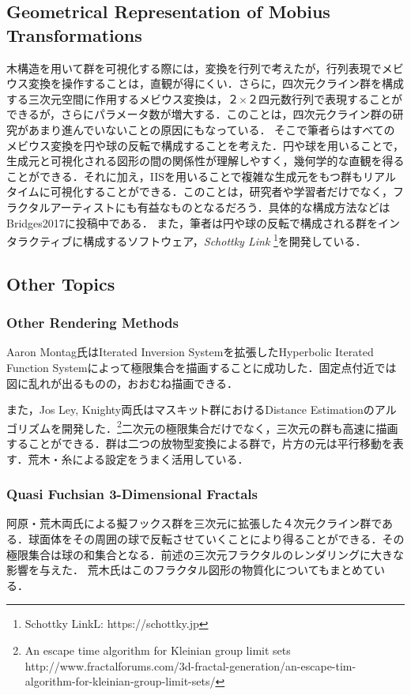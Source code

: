 \subsection{Geometrical Representation of Mobius Transformations}

木構造を用いて群を可視化する際には，変換を行列で考えたが，行列表現でメビウス変換を操作することは，直観が得にくい．さらに，四次元クライン群を構成する三次元空間に作用するメビウス変換は，２×２四元数行列で表現することができるが，さらにパラメータ数が増大する．このことは，四次元クライン群の研究があまり進んでいないことの原因にもなっている．
そこで筆者らはすべてのメビウス変換を円や球の反転で構成することを考えた．円や球を用いることで，生成元と可視化される図形の間の関係性が理解しやすく，幾何学的な直観を得ることができる．それに加え，IISを用いることで複雑な生成元をもつ群もリアルタイムに可視化することができる．このことは，研究者や学習者だけでなく，フラクタルアーティストにも有益なものとなるだろう．具体的な構成方法などはBridges2017に投稿中である．
また，筆者は円や球の反転で構成される群をインタラクティブに構成するソフトウェア，{\it Schottky Link} \footnote{Schottky LinkL: https://schottky.jp}を開発している．

\subsection{Other Topics}

\subsubsection{Other Rendering Methods}
Aaron Montag氏はIterated Inversion Systemを拡張したHyperbolic Iterated Function Systemによって極限集合を描画することに成功した\cite{hyperbolicIFS}．固定点付近では図に乱れが出るものの，おおむね描画できる．

また，Jos Ley, Knighty両氏はマスキット群におけるDistance Estimationのアルゴリズムを開発した．\footnote{An escape time algorithm for Kleinian group limit sets http://www.fractalforums.com/3d-fractal-generation/an-escape-tim-algorithm-for-kleinian-group-limit-sets/}二次元の極限集合だけでなく，三次元の群も高速に描画することができる．群は二つの放物型変換による群で，片方の元は平行移動を表す．荒木・糸\cite{maskit}による設定をうまく活用している．

\subsubsection{Quasi Fuchsian 3-Dimensional Fractals}
阿原・荒木両氏による擬フックス群を三次元に拡張した４次元クライン群である\cite{sphairahedra}\cite{sphairahedraJa}．球面体をその周囲の球で反転させていくことにより得ることができる．その極限集合は球の和集合となる．前述の三次元フラクタルのレンダリングに大きな影響を与えた．
荒木氏はこのフラクタル図形の物質化についてもまとめている\cite{materializing}．

